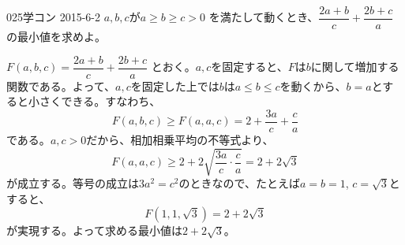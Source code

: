 \begin{prob}{025}{}{学コン 2015-6-2}
 $a,b,c$が$a \ge b \ge c > 0$ を満たして動くとき、$\dfrac{2a+b}{c}+\dfrac{2b+c}{a}$の最小値を求めよ。
\end{prob}
$F(a, b, c)=\dfrac{2a+b}{c}+\dfrac{2b+c}{a}$ とおく。$a, c$を固定すると、$F$は$b$に関して増加する関数である。よって、$a, c$を固定した上では$b$は$a\le b\le c$を動くから、$b=a$とすると小さくできる。すなわち、
\[ F(a, b, c)\ge F(a, a, c)=2+\frac{3a}{c}+\frac{c}{a} \]
である。$a, c>0$だから、相加相乗平均の不等式より、
\[ F(a, a, c)\ge 2+2\sqrt{\frac{3a}{c}\cdot\frac{c}{a}}=2+2\sqrt{3} \]
が成立する。等号の成立は$3a^2=c^2$のときなので、たとえば$a=b=1$, $c=\sqrt{3}$とすると、
\[ F(1, 1, \sqrt{3})=2+2\sqrt{3} \]
が実現する。よって求める最小値は$2+2\sqrt{3}$。
